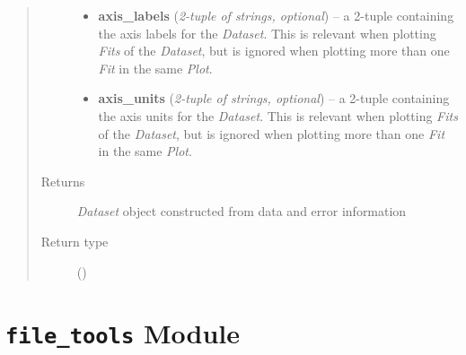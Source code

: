 \documentclass[a4paper,10pt,english]{sphinxmanual}
\begin{document}
\begin{fulllineitems}
\begin{quote}
\begin{description}
\begin{itemize}
\item {} 
\textbf{axis\_labels} (\emph{2-tuple of strings, optional}) --
a 2-tuple containing the axis labels for the \emph{Dataset}. This is
relevant when plotting \emph{Fits} of the \emph{Dataset}, but is ignored when
plotting more than one \emph{Fit} in the same \emph{Plot}.

\item {} 
\textbf{axis\_units} (\emph{2-tuple of strings, optional}) --
a 2-tuple containing the axis units for the \emph{Dataset}. This is
relevant when plotting \emph{Fits} of the \emph{Dataset}, but is ignored when
plotting more than one \emph{Fit} in the same \emph{Plot}.

\end{itemize}

\item[{Returns}] \leavevmode
\emph{Dataset} object constructed from data and error information

\item[{Return type}] \leavevmode
{\hyperref[index:kafe.dataset.Dataset]{\emph{}}} ()

\end{description}\end{quote}

\end{fulllineitems}



\section{\texttt{file\_tools} Module}
\label{index:file-tools-module}\label{index:module-kafe.file_tools}\label{index:module-file_tools}
\end{document}
